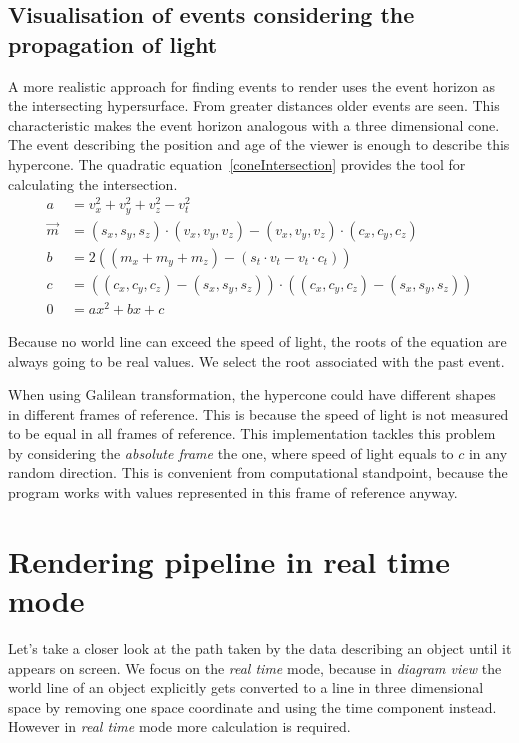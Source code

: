 \documentclass{egpubl}
\begin{document}
\subsection{Visualisation of events considering the propagation of light}
\label{visConsLight}
A more realistic approach for finding events to render uses the event horizon as the intersecting hypersurface. From greater distances older events are seen. This characteristic makes the event horizon analogous with a three dimensional cone. The  event describing the position and age of the viewer is enough to describe this hypercone. The quadratic equation~\ref{coneIntersection} provides the tool for calculating the intersection.
\begin{equation}
\label{coneIntersection}
\begin{aligned}
a &= v_x^2 + v_y^2 + v_z^2 - v_t^2\\
\vec{m} &= (s_x, s_y, s_z)\cdot{}(v_x, v_y, v_z) - (v_x, v_y, v_z)\cdot{}(c_x, c_y, c_z)\\
b &= 2((m_x + m_y + m_z) - (s_t\cdot{}v_t - v_t\cdot{}c_t))\\
c &= ((c_x, c_y, c_z) - (s_x, s_y, s_z))\cdot{}((c_x, c_y, c_z) - (s_x, s_y, s_z))\\
0 &=ax^2 + bx + c
\end{aligned}
\end{equation}

Because no world line can exceed the speed of light, the roots of the equation are always going to be real values. We select the root associated with the past event. 

When using Galilean transformation, the hypercone could have different shapes in different frames of reference. This is because the speed of light is not measured to be equal in all frames of reference. This implementation tackles this problem by considering the \emph{absolute frame} the one, where speed of light equals to $c$ in any random direction. This is convenient from computational standpoint, because the program works with values represented in this frame of reference anyway.

\section{Rendering pipeline in real time mode}
Let's take a closer look at the path taken by the data describing an object until it appears on screen. We focus on the \emph{real time} mode, because in \emph{diagram view} the world line of an object explicitly gets converted to a line in three dimensional space by removing one space coordinate and using the time component instead. However in \emph{real time} mode more calculation is required.
\end{document}
